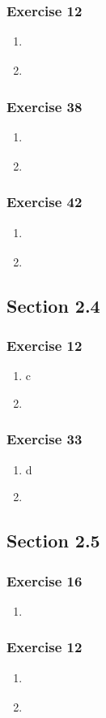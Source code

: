 \documentclass[a4paper]{article}
\newcommand{\ex}[1]{\subsubsection*{#1}}
\begin{document}
\ex{Exercise 12}
\begin{enumerate}[label=\alph*)]
    \item{
    }

    \item{
    }
\end{enumerate}


\ex{Exercise 38}
\begin{enumerate}[label=\alph*)]
    \item{
    }

    \item{
    }
\end{enumerate}


\ex{Exercise 42}
\begin{enumerate}[label=\alph*)]
    \item{
    }

    \item{
    }
\end{enumerate}


\vspace{2em}
\subsection*{Section 2.4}
\vspace{1em}

\ex{Exercise 12}
\begin{enumerate}[label=\alph*)]
    \item{ c
    }

    \item{
    }
\end{enumerate}


\ex{Exercise 33}
\begin{enumerate}[label=\alph*)]
    \item{ d
    }

    \item{
    }
\end{enumerate}


\vspace{2em}
\subsection*{Section 2.5}
\vspace{1em}

\ex{Exercise 16}
\begin{enumerate}[label=\alph*)]
    \item{
    }
\end{enumerate}


\ex{Exercise 12}
\begin{enumerate}[label=\alph*)]
    \item{
    }

    \item{
    }
\end{enumerate}


%
\end{document}
